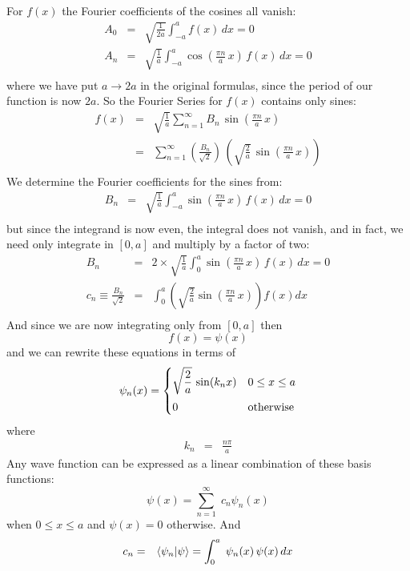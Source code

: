 \documentclass[12pt]{book}
\begin{document}
For $f(x)$ the Fourier coefficients of the cosines all vanish:
\begin{eqnarray*}
A_0 &=& \sqrt{\frac{1}{2a}} \int_{-a}^{a} f(x) \, dx = 0\\
A_n &=& \sqrt{\frac{1}{a}} \int_{-a}^{a} 
\cos\left(\frac{\pi n}{a} \, x \right) \, f(x) \, dx = 0\\
\end{eqnarray*}
where we have put $a \to 2a$ in the original formulas, since the period of our function is now $2a$.  So the Fourier Series for $f(x)$ contains only sines:
\begin{eqnarray*}
f(x) &=& \sqrt{\frac{1}{a}} \sum_{n=1}^{\infty}  B_n \, \sin\left(\frac{\pi n}{a} \, x \right) \\
&=&  \sum_{n=1}^{\infty}  \left( \frac{B_n}{\sqrt{2}}\right) \, \left( \sqrt{\frac{2}{a}} \, \sin\left(\frac{\pi n}{a} \, x \right) \right)\\
\end{eqnarray*}
We determine the Fourier coefficients for the sines from:
\begin{eqnarray*}
B_n &=& \sqrt{\frac{1}{a}} \int_{-a}^{a} 
\sin\left(\frac{\pi n}{a} \, x \right) \, f(x) \, dx = 0\\
\end{eqnarray*}
but since the integrand is now even, the integral does not vanish, and in fact, we need only integrate in $[0,a]$ and multiply by a factor of two:
\begin{eqnarray*}
B_n &=& 2 \times \sqrt{\frac{1}{a}} \int_{0}^{a} 
\sin\left(\frac{\pi n}{a} \, x \right) \, f(x) \, dx = 0\\[14pt]
c_n \equiv \frac{B_n}{\sqrt{2}} &=& \int_{0}^{a} 
\left( \sqrt{\frac{2}{a}} \sin\left(\frac{\pi n}{a} \, x \right) \right) f(x) dx \\
\end{eqnarray*}
And since we are now integrating only from $[0,a]$ then 
$$f(x) = \psi(x)$$ 
and we can rewrite these equations in terms of 
\begin{equation}
\psi_n(x) = 
\begin{cases}
{\displaystyle \sqrt{\frac{2}{a}} \, \sin(k_n x)} & 0 \leq x \leq a\\[8pt]
0 & \rm otherwise \\
\end{cases}
\end{equation}
where
\begin{eqnarray*}
k_n&=&\frac{n\pi}{a}
\end{eqnarray*}
Any wave function can be expressed as a linear combination of these basis functions:
\begin{equation}
\psi(x) = \sum_{n=1}^{\infty} \; c_n \psi_n(x)
\end{equation}
when $0 \leq x \leq a$ and $\psi(x) = 0$ otherwise.  And
\begin{eqnarray*}
c_n &=& \braket{\psi_n| \psi} = \int_{0}^{a} \; \psi_n(x) \, \psi(x) \, dx \\
\end{eqnarray*}
\end{document}
